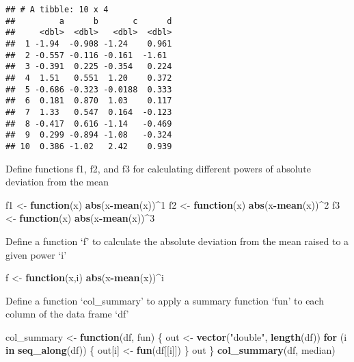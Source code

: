 \documentclass[
]{article}
\newenvironment{Shaded}{\begin{snugshade}}{\end{snugshade}}
\newcommand{\ControlFlowTok}[1]{\textcolor[rgb]{0.13,0.29,0.53}{\textbf{#1}}}
\newcommand{\DecValTok}[1]{\textcolor[rgb]{0.00,0.00,0.81}{#1}}
\newcommand{\FunctionTok}[1]{\textcolor[rgb]{0.13,0.29,0.53}{\textbf{#1}}}
\newcommand{\NormalTok}[1]{#1}
\newcommand{\OtherTok}[1]{\textcolor[rgb]{0.56,0.35,0.01}{#1}}
\newcommand{\SpecialCharTok}[1]{\textcolor[rgb]{0.81,0.36,0.00}{\textbf{#1}}}
\newcommand{\StringTok}[1]{\textcolor[rgb]{0.31,0.60,0.02}{#1}}
\begin{document}
\begin{verbatim}
## # A tibble: 10 x 4
##         a      b       c      d
##     <dbl>  <dbl>   <dbl>  <dbl>
##  1 -1.94  -0.908 -1.24    0.961
##  2 -0.557 -0.116 -0.161  -1.61 
##  3 -0.391  0.225 -0.354   0.224
##  4  1.51   0.551  1.20    0.372
##  5 -0.686 -0.323 -0.0188  0.333
##  6  0.181  0.870  1.03    0.117
##  7  1.33   0.547  0.164  -0.123
##  8 -0.417  0.616 -1.14   -0.469
##  9  0.299 -0.894 -1.08   -0.324
## 10  0.386 -1.02   2.42    0.939
\end{verbatim}

Define functions f1, f2, and f3 for calculating different powers of
absolute deviation from the mean

\begin{Shaded}
\begin{Highlighting}[]
\NormalTok{f1 }\OtherTok{\textless{}{-}} \ControlFlowTok{function}\NormalTok{(x) }\FunctionTok{abs}\NormalTok{(x}\SpecialCharTok{{-}}\FunctionTok{mean}\NormalTok{(x))}\SpecialCharTok{\^{}}\DecValTok{1}
\NormalTok{f2 }\OtherTok{\textless{}{-}} \ControlFlowTok{function}\NormalTok{(x) }\FunctionTok{abs}\NormalTok{(x}\SpecialCharTok{{-}}\FunctionTok{mean}\NormalTok{(x))}\SpecialCharTok{\^{}}\DecValTok{2}
\NormalTok{f3 }\OtherTok{\textless{}{-}} \ControlFlowTok{function}\NormalTok{(x) }\FunctionTok{abs}\NormalTok{(x}\SpecialCharTok{{-}}\FunctionTok{mean}\NormalTok{(x))}\SpecialCharTok{\^{}}\DecValTok{3}
\end{Highlighting}
\end{Shaded}

Define a function `f' to calculate the absolute deviation from the mean
raised to a given power `i'

\begin{Shaded}
\begin{Highlighting}[]
\NormalTok{f }\OtherTok{\textless{}{-}} \ControlFlowTok{function}\NormalTok{(x,i) }\FunctionTok{abs}\NormalTok{(x}\SpecialCharTok{{-}}\FunctionTok{mean}\NormalTok{(x))}\SpecialCharTok{\^{}}\NormalTok{i}
\end{Highlighting}
\end{Shaded}

Define a function `col\_summary' to apply a summary function `fun' to
each column of the data frame `df'

\begin{Shaded}
\begin{Highlighting}[]
\NormalTok{col\_summary }\OtherTok{\textless{}{-}} \ControlFlowTok{function}\NormalTok{(df, fun) \{}
\NormalTok{  out }\OtherTok{\textless{}{-}} \FunctionTok{vector}\NormalTok{(}\StringTok{"double"}\NormalTok{, }\FunctionTok{length}\NormalTok{(df))}
  \ControlFlowTok{for}\NormalTok{ (i }\ControlFlowTok{in} \FunctionTok{seq\_along}\NormalTok{(df)) \{}
\NormalTok{    out[i] }\OtherTok{\textless{}{-}} \FunctionTok{fun}\NormalTok{(df[[i]])}
\NormalTok{  \}}
\NormalTok{  out}
\NormalTok{\}}
\FunctionTok{col\_summary}\NormalTok{(df, median)}
\end{Highlighting}
\end{Shaded}
\end{document}
